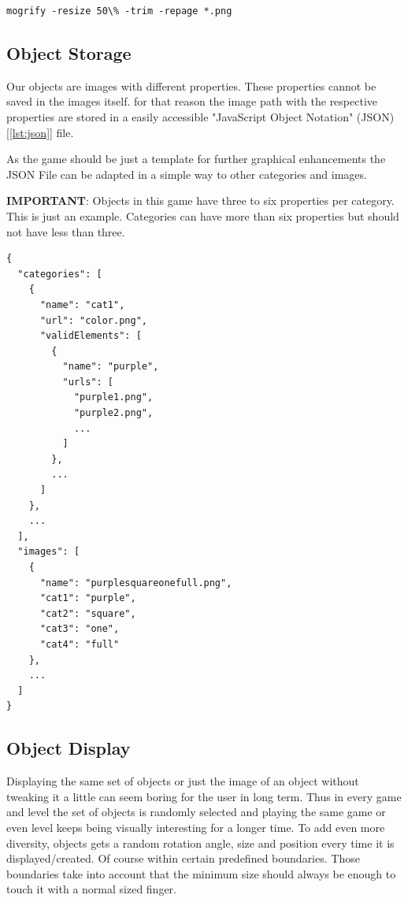 \begin{lstlisting}[style=TypeScript, caption={ImageMagick console command "mogrify"}, label={lst:mogrify}]
    mogrify -resize 50\% -trim -repage *.png
\end{lstlisting}

\subsection{Object Storage}\label{subsec:object-storage}
Our objects are images with different properties.
These properties cannot be saved in the images itself.
for that reason the image path with the respective properties are stored in a easily accessible
"JavaScript Object Notation" (JSON) [\ref{lst:json}] file.

As the game should be just a template for further graphical enhancements the JSON File can be adapted in a simple way
to other categories and images.

\textbf{IMPORTANT}: Objects in this game have three to six properties per category. This is just an example.
Categories can have more than six properties but should not have less than three.

\begin{lstlisting}[style=TypeScript, caption={JavaScript Object Notation File (geometrical\_objects.json)}, label={lst:json}]
{
  "categories": [
    {
      "name": "cat1",
      "url": "color.png",
      "validElements": [
        {
          "name": "purple",
          "urls": [
            "purple1.png",
            "purple2.png",
            ...
          ]
        },
        ...
      ]
    },
    ...
  ],
  "images": [
    {
      "name": "purplesquareonefull.png",
      "cat1": "purple",
      "cat2": "square",
      "cat3": "one",
      "cat4": "full"
    },
    ...
  ]
}
\end{lstlisting}

\subsection{Object Display}\label{subsec:object-display}
Displaying the same set of objects or just the image of an object without tweaking it a little can seem boring for the user in long term.
Thus in every game and level the set of objects is randomly selected
and playing the same game or even level keeps being visually interesting for a longer time.
To add even more diversity, objects gets a random rotation angle, size and position every time it is displayed/created.
Of course within certain predefined boundaries.
Those boundaries take into account that the minimum size should always be enough to touch it with a normal sized finger.


